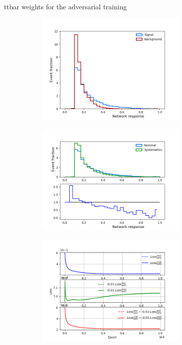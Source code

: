 \documentclass[10pt, UKenglish]{beamer}
\begin{document}
\begin{frame}{ttbar weights for the adversarial training}
    \begin{figure}[htbp]
    \caption{Weight = 0}
    \centering
    \begin{subfigure}[b]{0.47\textwidth}
        \includegraphics[width=0.8\textwidth]{discriminator_50per.png}
        \label{fig:simple:final:sepa}
    \end{subfigure}
\quad
    \begin{subfigure}[b]{0.47\textwidth}
        \includegraphics[width=0.8\textwidth]{adversary_50per.png}
        \label{fig:simple:final:syst}
    \end{subfigure}
    \end{figure}
    \vspace{-0.7cm}
    \begin{figure}[htbp]
    \caption{Weight = 1}
    \centering
    \begin{subfigure}[b]{0.47\textwidth}
        \includegraphics[width=0.8\textwidth]{losses_50per.png}

\end{subfigure}
\end{figure}
\end{frame}
\end{document}
